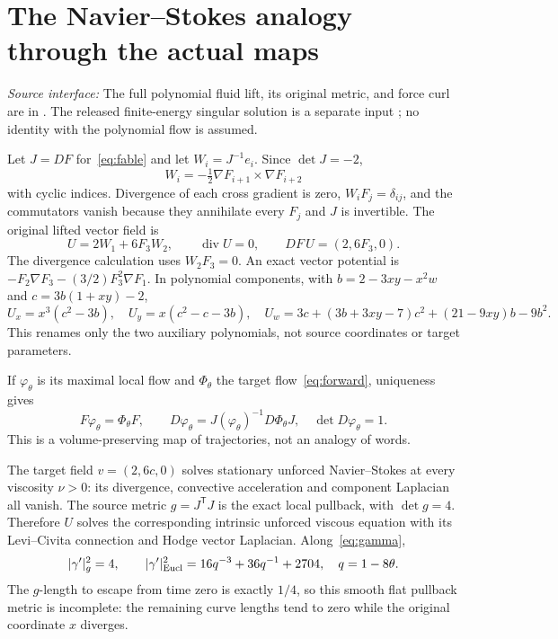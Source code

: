 \documentclass[11pt,a4paper]{article}
\theoremstyle{definition}\newtheorem{definition}[theorem]{Definition}\newtheorem{remark}[theorem]{Remark}
\newcommand{\src}[1]{\textit{Source interface:} #1}
\begin{document}
\section{The Navier--Stokes analogy through the actual maps}
\src{The full polynomial fluid lift, its original metric, and force curl are in \cite{IFH}. The released finite-energy singular solution is a separate input \cite{NS}; no identity with the polynomial flow is assumed.}

Let $J=DF$ for~\eqref{eq:fable} and let $W_i=J^{-1}e_i$. Since $\det J=-2$,
\[
 W_i=-\tfrac12\nabla F_{i+1}\times\nabla F_{i+2}
\]
with cyclic indices. Divergence of each cross gradient is zero, $W_iF_j=\delta_{ij}$, and the commutators vanish because they annihilate every $F_j$ and $J$ is invertible. The original lifted vector field is
\begin{equation}
 U=2W_1+6F_3W_2,\qquad \operatorname{div}U=0,\qquad
 DF\,U=(2,6F_3,0).                                     \label{eq:fluidlift}
\end{equation}
The divergence calculation uses $W_2F_3=0$. An exact vector potential is $-F_2\nabla F_3-(3/2)F_3^2\nabla F_1$. In polynomial components, with $b=2-3xy-x^2w$ and $c=3b(1+xy)-2$,
\begin{equation}
 U_x=x^3(c^2-3b),\quad U_y=x(c^2-c-3b),\quad
 U_w=3c+(3b+3xy-7)c^2+(21-9xy)b-9b^2.                   \label{eq:Ucomponents}
\end{equation}
This renames only the two auxiliary polynomials, not source coordinates or target parameters.

If $\varphi_\theta$ is its maximal local flow and $\Phi_\theta$ the target flow~\eqref{eq:forward}, uniqueness gives
\begin{equation}
 F\varphi_\theta=\Phi_\theta F,\qquad
 D\varphi_\theta=J(\varphi_\theta)^{-1}D\Phi_\theta J,
 \quad\det D\varphi_\theta=1.                            \label{eq:material}
\end{equation}
This is a volume-preserving map of trajectories, not an analogy of words.

The target field $v=(2,6c,0)$ solves stationary unforced Navier--Stokes at every viscosity $\nu>0$: its divergence, convective acceleration and component Laplacian all vanish. The source metric $g=J^{\mathsf T}J$ is the exact local pullback, with $\det g=4$. Therefore $U$ solves the corresponding intrinsic unforced viscous equation with its Levi--Civita connection and Hodge vector Laplacian. Along~\eqref{eq:gamma},
\begin{equation}
 |\gamma'|_g^2=4,\qquad
 |\gamma'|_{\rm Eucl}^2=16q^{-3}+36q^{-1}+2704,
 \quad q=1-8\theta.                                    \label{eq:speed}
\end{equation}
The $g$-length to escape from time zero is exactly $1/4$, so this smooth flat pullback metric is incomplete: the remaining curve lengths tend to zero while the original coordinate $x$ diverges.
\end{document}
